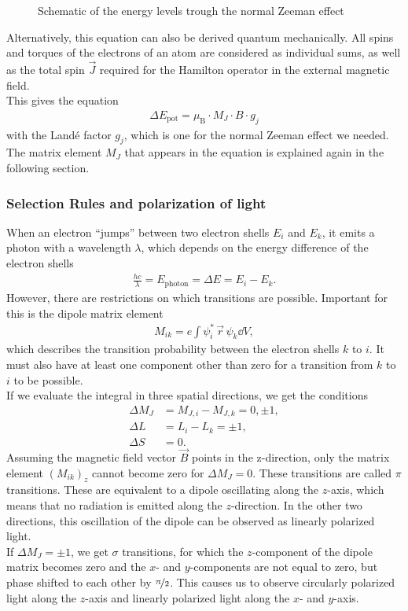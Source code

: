 \begin{figure}[ht]
\centering

\caption{Schematic of the energy levels trough the normal Zeeman effect}
\label{fig:splitting}
\end{figure}

Alternatively, this equation can also be derived quantum mechanically.
All spins and torques of the electrons of an atom are considered as individual sums, as well as the total spin $\vec{J}$ required for the Hamilton operator in the external magnetic field.\\
This gives the equation
\begin{align}
\Delta E_\text{pot} = \mu_\text{B} \cdot M_J \cdot B \cdot g_j
\end{align}
with the Landé factor $g_j$, which is one for the normal Zeeman effect we needed.
The matrix element $M_J$ that appears in the equation is explained again in the following section.

\subsubsection{Selection Rules and polarization of light}
When an electron \enquote{jumps} between two electron shells $E_i$ and $E_k$, it emits a photon with a wavelength $\lambda$, which depends on the energy difference of the electron shells
\begin{align}
\frac{hc}{\lambda} = E_\text{photon} = \Delta E = E_i - E_k.
\end{align}
However, there are restrictions on which transitions are possible.
Important for this is the dipole matrix element
\begin{align}
M_{ik} = e \int \psi_i^* \, \vec{r} \, \psi_k \dd{V},
\end{align}
which describes the transition probability between the electron shells $k$ to $i$.
It must also have at least one component other than zero for a transition from $k$ to $i$ to be possible.\\
If we evaluate the integral in three spatial directions, we get the conditions
\begin{align}
\Delta M_J &= M_{J,i} - M_{J,k} = 0, \pm 1,\\
\Delta L &= L_i - L_k = \pm 1,\\
\Delta S &= 0.
\end{align}
Assuming the magnetic field vector $\vec{B}$ points in the z-direction, only the matrix element $(M_{ik})_z$ cannot become zero for $\Delta M_J = 0$.
These transitions are called $\pi$ transitions.
These are equivalent to a dipole oscillating along the $z$-axis, which means that no radiation is emitted along the $z$-direction. In the other two directions, this oscillation of the dipole can be observed as linearly polarized light.\\
If $\Delta M_J = \pm 1$, we get $\sigma$ transitions, for which the $z$-component of the dipole matrix becomes zero and the $x$- and $y$-components are not equal to zero, but phase shifted to each other by $\nicefrac{\pi}{2}$.
This causes us to observe circularly polarized light along the $z$-axis and linearly polarized light along the $x$- and $y$-axis.\\

